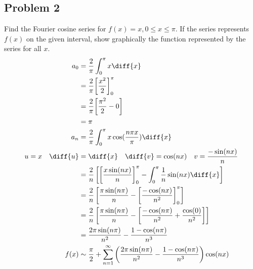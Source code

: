 \documentclass{math}
\begin{document}
\subsection*{Problem 2}
Find the Fourier cosine series for \( f(x) = x, 0\le x\le \pi \). If the
series represents \( f(x) \) on the given interval, show graphically the
function represented by the series for all \( x \).
\begin{align*}
  a_0 &= \frac{2}{\pi}\int_{0}^{\pi}x\diff{x} \\
  &= \frac{2}{\pi}\bigg[\frac{x^2}{2}\bigg]_{0}^{\pi} \\
  &= \frac{2}{\pi}\bigg[\frac{\pi^2}{2}-0\bigg] \\
  &= \pi \\
  a_n &= \frac{2}{\pi}\int_{0}^{\pi}x\cos(\frac{n\pi x}{\pi})\diff{x} \\
  u = x \quad \diff{u} &= \diff{x} \quad \diff{v} = \cos(nx) \quad
    v = \frac{-\sin(nx)}{n} \\
  &= \frac{2}{n}\left[\left[\frac{x\sin(nx)}{n}\right]_{0}^{\pi}-
    \int_{0}^{\pi}\frac{1}{n}\sin(nx)\diff{x}\right] \\
  &= \frac{2}{n}\left[\frac{\pi\sin(n\pi)}{n}-
    \left[\frac{-\cos(nx)}{n^2}\right]_{0}^{\pi}\right] \\
  &= \frac{2}{n}\left[\frac{\pi\sin(n\pi)}{n}-
    \left[\frac{-\cos(n\pi)}{n^2}+\frac{\cos(0)}{n^2}\right]\right] \\
  &= \frac{2\pi\sin(n\pi)}{n^2}-\frac{1-\cos(n\pi)}{n^3} \\
  f(x) &\sim \frac{\pi}{2}+\sum_{n=1}^{\infty}\left(
    \frac{2\pi\sin(n\pi)}{n^2}-\frac{1-\cos(n\pi)}{n^3}\right)\cos(nx)
\end{align*}
\begin{center}
\end{center}
\end{document}
